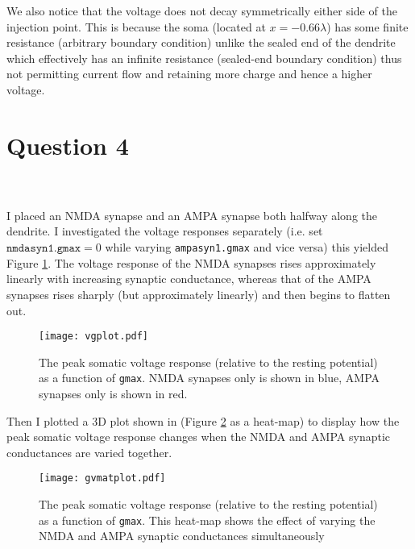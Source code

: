 \documentclass[paper=a4, fontsize=11pt]{scrartcl} %
\numberwithin{equation}{section} %
\numberwithin{figure}{section} %
\numberwithin{table}{section} %
\begin{document}
We also notice that the voltage does not decay symmetrically either side of the injection point. This is because the soma (located at $x=-0.66\lambda$) has some finite resistance (arbitrary boundary condition) unlike the sealed end of the dendrite which effectively has an infinite resistance (sealed-end boundary condition) thus not permitting current flow and retaining more charge and hence a higher voltage.\\ 


\newpage
\section{\textbf{Question 4}}

\\
\\

I placed an NMDA synapse and an AMPA synapse both halfway along the dendrite. I investigated the voltage responses separately (i.e. set $\texttt{nmdasyn1.gmax}=0$ while varying \texttt{ampasyn1.gmax} and vice versa) this yielded Figure \ref{fig:vgplot}. The voltage response of the NMDA synapses rises approximately linearly with increasing synaptic conductance, whereas that of the AMPA synapses rises sharply (but approximately linearly) and then begins to flatten out.\\

\begin{figure}[!h]
\centering
\texttt{[image: vgplot.pdf]}
  \caption{The peak somatic voltage response (relative to the resting potential) as a function of \texttt{gmax}. NMDA synapses only is shown in blue, AMPA synapses only is shown in red.}
  \label{fig:vgplot}
\end{figure}

Then I plotted a 3D plot shown in (Figure \ref{fig:gvmatplot} as a heat-map) to display how the peak somatic voltage response changes when the NMDA and AMPA synaptic conductances are varied together.\\

\begin{figure}[!h]
\centering
\texttt{[image: gvmatplot.pdf]}
  \caption{The peak somatic voltage response (relative to the resting potential) as a function of \texttt{gmax}. This heat-map shows the effect of varying the NMDA and AMPA synaptic conductances simultaneously}
  \label{fig:gvmatplot}
\end{figure}
\end{document}
